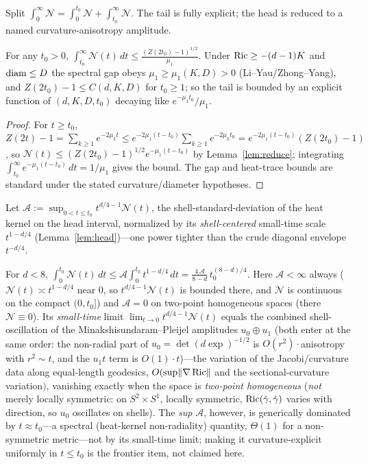 Split $\int_0^\infty\mathcal N=\int_0^{t_0}\mathcal N+\int_{t_0}^\infty\mathcal N$. The tail is
fully explicit; the head is reduced to a named curvature-anisotropy amplitude.

\begin{lemma}\label{lem:tail}
For any $t_0>0$,
$\displaystyle\int_{t_0}^\infty\mathcal N(t)\,dt\le\frac{(Z(2t_0)-1)^{1/2}}{\mu_1}$.
Under $\operatorname{Ric}\ge-(d-1)K$ and $\operatorname{diam}\le D$ the spectral gap obeys $\mu_1\ge\mu_1(K,D)>0$
(Li--Yau/Zhong--Yang), and $Z(2t_0)-1\le C(d,K,D)$ for $t_0\ge1$; so the tail is bounded by
an explicit function of $(d,K,D,t_0)$ decaying like $e^{-\mu_1 t_0}/\mu_1$.
\end{lemma}

\begin{proof}
For $t\ge t_0$, $Z(2t)-1=\sum_{k\ge1}e^{-2\mu_k t}\le e^{-2\mu_1(t-t_0)}\sum_{k\ge1}e^{-2\mu_k t_0}
=e^{-2\mu_1(t-t_0)}(Z(2t_0)-1)$, so $\mathcal N(t)\le(Z(2t_0)-1)^{1/2}e^{-\mu_1(t-t_0)}$ by
Lemma~\ref{lem:reduce}; integrating $\int_{t_0}^\infty e^{-\mu_1(t-t_0)}\,dt=1/\mu_1$ gives the
bound. The gap and heat-trace bounds are standard under the stated curvature/diameter
hypotheses.
\end{proof}

\begin{definition}\label{def:aniso}
Let $\mathcal A:=\sup_{0<t\le t_0}t^{d/4-1}\mathcal N(t)$, the shell-standard-deviation of the
heat kernel on the head interval, normalized by its \emph{shell-centered} small-time scale
$t^{1-d/4}$ (Lemma~\ref{lem:head})---one power tighter than the crude diagonal envelope
$t^{-d/4}$.
\end{definition}

\begin{lemma}\label{lem:head}
For $d<8$, $\displaystyle\int_0^{t_0}\mathcal N(t)\,dt\le\mathcal A\int_0^{t_0}t^{1-d/4}\,dt
=\frac{4\,\mathcal A}{8-d}\,t_0^{(8-d)/4}$. Here $\mathcal A<\infty$ always
($\mathcal N(t)\asymp t^{1-d/4}$ near $0$, so $t^{d/4-1}\mathcal N(t)$ is bounded there, and
$\mathcal N$ is continuous on the compact $(0,t_0]$) and $\mathcal A=0$ on two-point
homogeneous spaces (there $\mathcal N\equiv0$). Its \emph{small-time} limit
$\lim_{t\to0}t^{d/4-1}\mathcal N(t)$ equals the combined shell-oscillation of the
Minakshisundaram--Pleijel amplitudes $u_0\oplus u_1$ (both enter at the same order: the
non-radial part of $u_0=\det(d\exp)^{-1/2}$ is $O(r^2)\cdot$anisotropy with $r^2\sim t$, and the
$u_1t$ term is $O(1)\cdot t$)---the variation of the Jacobi/curvature data along equal-length
geodesics, $O(\sup\lVert\nabla\operatorname{Ric}\rVert$ and the sectional-curvature variation$)$, vanishing
exactly when the space is \emph{two-point homogeneous} (\emph{not} merely locally symmetric: on
$S^2\times S^1$, locally symmetric, $\operatorname{Ric}(\dot\gamma,\dot\gamma)$ varies with direction, so
$u_0$ oscillates on shells). The \emph{sup} $\mathcal A$, however, is generically dominated by
$t\approx t_0$---a spectral (heat-kernel non-radiality) quantity, $\Theta(1)$ for a
non-symmetric metric---not by its small-time limit; making it curvature-explicit uniformly in
$t\le t_0$ is the frontier item, not claimed here.
\end{lemma}

